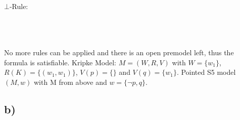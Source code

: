 \documentclass[a4paper]{article}
\begin{document}
\\
$\bot$-Rule:\\
\\
\\
\\
No more rules can be applied and there is an open premodel left, thus the formula is satisfiable.
Kripke Model: $M = (W, R, V)$ with $W = \{w_1\}$, $R(K) = \{(w_1, w_1)\}$,
              $V(p) = \{\}$ and $V(q) = \{w_1\}$. 
Pointed S5 model $(M, w)$ with M from above and $w=\{\lnot p, q\}$.

\subsection{b)}
\end{document}
